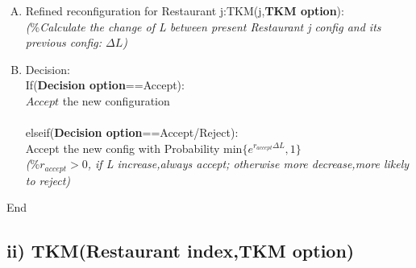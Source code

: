 \documentclass{article}
\begin{document}
\begin{spacing}{1.1}
\begin{enumerate}[(A)]
\item Refined reconfiguration for Restaurant j:TKM(j,{\bf TKM option}):\\
\small{\emph{($\%$Calculate the change of L between present Restaurant j config and its previous config: $\Delta L$)}}
\item Decision:\\
If({\bf Decision option}==Accept):\\
$Accept$ the new configuration\\ \\
elseif({\bf Decision option}==Accept/Reject):\\
Accept the new config with Probability min$\{e^{r_{accept}\Delta L},1\}$\\
\small{\emph{($\%r_{accept}>0$, if L increase,always accept; otherwise more decrease,more likely to reject)}}
\end{enumerate}
End
\subsection{ii) TKM(Restaurant index,TKM option)}



\end{spacing}
\end{document}
